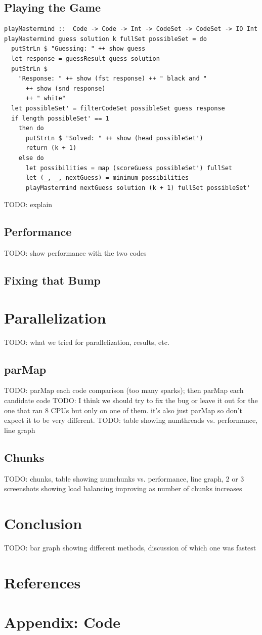 \documentclass{article}
\begin{document}
\subsection{Playing the Game}
\begin{verbatim}
playMastermind ::  Code -> Code -> Int -> CodeSet -> CodeSet -> IO Int
playMastermind guess solution k fullSet possibleSet = do
  putStrLn $ "Guessing: " ++ show guess
  let response = guessResult guess solution
  putStrLn $
    "Response: " ++ show (fst response) ++ " black and "
      ++ show (snd response)
      ++ " white"
  let possibleSet' = filterCodeSet possibleSet guess response
  if length possibleSet' == 1
    then do
      putStrLn $ "Solved: " ++ show (head possibleSet')
      return (k + 1)
    else do
      let possibilities = map (scoreGuess possibleSet') fullSet
      let (_, _, nextGuess) = minimum possibilities
      playMastermind nextGuess solution (k + 1) fullSet possibleSet'
\end{verbatim}
TODO: explain

\subsection{Performance}
TODO: show performance with the two codes
\subsection{Fixing that Bump}

\section{Parallelization}
TODO: what we tried for parallelization, results, etc.
\subsection{parMap}
TODO: parMap each code comparison (too many sparks); then parMap each candidate code
TODO: I think we should try to fix the bug or leave it out for the one that ran 8 CPUs but only on one of them. it's also just parMap so don't expect it to be very different.
TODO: table showing numthreads vs. performance, line graph
\subsection{Chunks}
TODO: chunks, table showing numchunks vs. performance, line graph, 2 or 3 screenshots showing load balancing improving as number of chunks increases


\section{Conclusion}
TODO: bar graph showing different methods, discussion of which one was fastest

\section{References}

\section{Appendix: Code}
\end{document}
